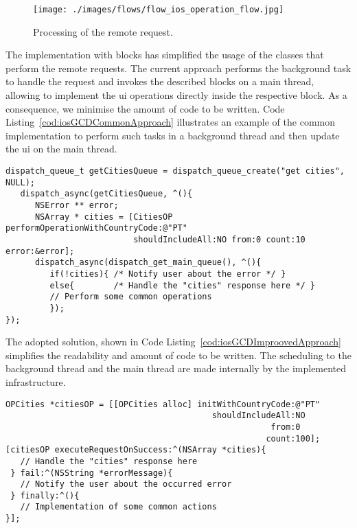 \begin{figure}[h!]
 \centering
   \texttt{[image: ./images/flows/flow\_ios\_operation\_flow.jpg]}
   \caption{Processing of the remote request.}
   \label{fig:iosExecutionFlow}
\end{figure}
The implementation with blocks has simplified the usage of the classes that perform the remote requests. The current approach performs the background task to handle the request and invokes the described blocks on a main thread, allowing to implement the \gls{ui} operations directly inside the respective block. As a consequence, we minimise the amount of code to be written. Code Listing~\ref{cod:iosGCDCommonApproach} illustrates an example of the common implementation to perform such tasks in a background thread and then update the \gls{ui} on the main thread.\\
\begin{lstlisting}[language={[Objective]C},caption={An example of the remote request using common GCD approach.},label={cod:iosGCDCommonApproach}, belowskip=3em, frame=bt, ]
dispatch_queue_t getCitiesQueue = dispatch_queue_create("get cities", NULL);
   dispatch_async(getCitiesQueue, ^(){
      NSError ** error;
      NSArray * cities = [CitiesOP performOperationWithCountryCode:@"PT" 
                          shouldIncludeAll:NO from:0 count:10 error:&error];
      dispatch_async(dispatch_get_main_queue(), ^(){
         if(!cities){ /* Notify user about the error */ }
         else{        /* Handle the "cities" response here */ }
         // Perform some common operations
         });
});
\end{lstlisting}
The adopted solution, shown in Code Listing~\ref{cod:iosGCDImproovedApproach} simplifies the readability and amount of code to be written. The scheduling to the background thread and the main thread are made internally by the implemented infrastructure.\\
\begin{lstlisting}[language={[Objective]C},caption={An example of the remote request using the adopted solution.},label={cod:iosGCDImproovedApproach}, frame=bt]
OPCities *citiesOP = [[OPCities alloc] initWithCountryCode:@"PT" 
                                          shouldIncludeAll:NO 
                                                      from:0 
                                                     count:100];
[citiesOP executeRequestOnSuccess:^(NSArray *cities){
   // Handle the "cities" response here
 } fail:^(NSString *errorMessage){
   // Notify the user about the occurred error
 } finally:^(){
   // Implementation of some common actions
}];
\end{lstlisting} 
